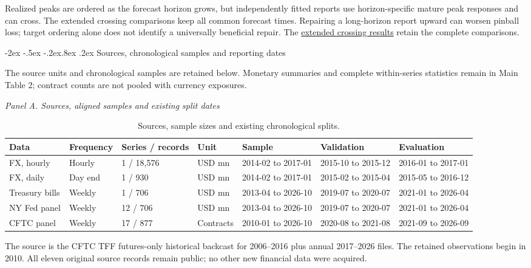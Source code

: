 \documentclass[10pt,a4paper]{article}
\makeatletter
\renewcommand\section{\@startsection{section}{1}{\z@}%
  {-2ex \@plus -.5ex \@minus -.2ex}{.8ex \@plus .2ex}%
  {\normalfont\large\bfseries}}
\makeatother
\begin{document}
Realized peaks are ordered as the forecast horizon grows, but
independently fitted reports use horizon-specific mature peak responses and can
cross. The extended crossing comparisons keep all common forecast times.
Repairing a long-horizon report upward can worsen pinball loss; target ordering
alone does not identify a universally beneficial repair.
The \href{https://github.com/ByronLi0207/financial-mathematics-paper-20261020/blob/submission-final/EXTENDED_RESULTS.md#asmbi-extended-s22}{extended crossing results} retain the complete comparisons.

\FloatBarrier


\section{Sources, chronological samples and reporting dates}\label{sup:v10-cftc}

The source units and chronological samples are retained below. Monetary summaries and complete within-series statistics remain in Main Table 2; contract counts are not pooled with currency exposures.
\begin{table}[htbp]\centering
\caption{Sources, sample sizes and existing chronological splits.}\label{tab:supplement-data}
\begingroup\fontsize{7.5}{9}\selectfont\setlength{\tabcolsep}{2pt}
\textit{Panel A. Sources, aligned samples and existing split dates}\\[3pt]
\begin{tabular}{@{}lllllll@{}}
\toprule
Data & Frequency & Series / records & Unit & Sample & Validation & Evaluation \\
\midrule
FX, hourly & Hourly & 1 / 18,576 & USD mn & 2014-02 to 2017-01 & 2015-10 to 2015-12 & 2016-01 to 2017-01 \\
FX, daily & Day end & 1 / 930 & USD mn & 2014-02 to 2017-01 & 2015-02 to 2015-04 & 2015-05 to 2016-12 \\
Treasury bills & Weekly & 1 / 706 & USD mn & 2013-04 to 2026-10 & 2019-07 to 2020-07 & 2021-01 to 2026-04 \\
NY Fed panel & Weekly & 12 / 706 & USD mn & 2013-04 to 2026-10 & 2019-07 to 2020-07 & 2021-01 to 2026-04 \\
CFTC panel & Weekly & 17 / 877 & Contracts & 2010-01 to 2026-10 & 2020-08 to 2021-08 & 2021-09 to 2026-09 \\
\bottomrule
\end{tabular}
\endgroup\end{table}

The source is the CFTC TFF futures-only historical backcast for 2006--2016 plus annual 2017--2026 files. The retained observations begin in 2010. All eleven original source records remain public; no other new financial data were acquired.
\end{document}
